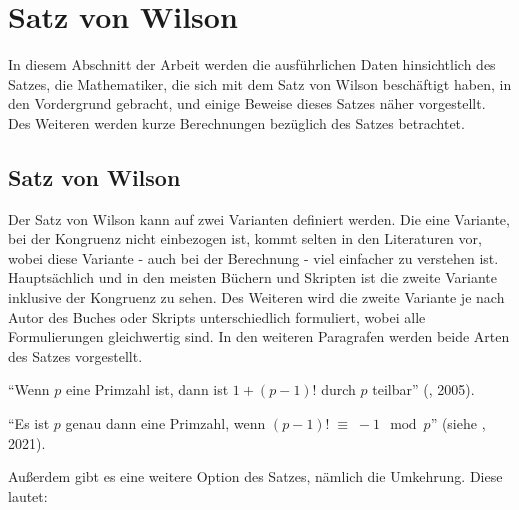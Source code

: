 %
%


\chapter{Satz von Wilson}

In diesem Abschnitt der Arbeit werden die ausführlichen Daten
hinsichtlich des Satzes, die Mathematiker, die sich mit dem
Satz von Wilson beschäftigt haben, in den Vordergrund gebracht,
und einige Beweise dieses Satzes näher vorgestellt. Des Weiteren
werden kurze Berechnungen bezüglich des Satzes betrachtet.
\vspace{.2cm}

\section{Satz von Wilson}

Der Satz von Wilson kann auf zwei Varianten definiert werden.
Die eine Variante, bei der Kongruenz nicht einbezogen ist,
kommt selten in den Literaturen vor, wobei diese Variante -
auch bei der Berechnung - viel einfacher zu verstehen ist.
Hauptsächlich und in den meisten Büchern und Skripten ist die
zweite Variante inklusive der Kongruenz zu sehen. Des Weiteren
wird die zweite Variante je nach Autor des Buches oder Skripts
unterschiedlich formuliert, wobei alle Formulierungen
gleichwertig sind. In den weiteren Paragrafen werden beide
Arten des Satzes vorgestellt.

\begin{theorem}
``Wenn $p$ eine Primzahl ist, dann ist $1 +(p-1)!$ durch
$p$ teilbar'' (\cite{oconnor_wilson}, 2005).
\end{theorem}

\begin{theorem}
``Es ist $p$ genau dann eine Primzahl, wenn
$(p-1)! \;\equiv\; -1\mod p$''
(siehe \cite{restklassen}, 2021).
\end{theorem}

Außerdem gibt es eine weitere Option des Satzes, nämlich
die Umkehrung. Diese lautet:

